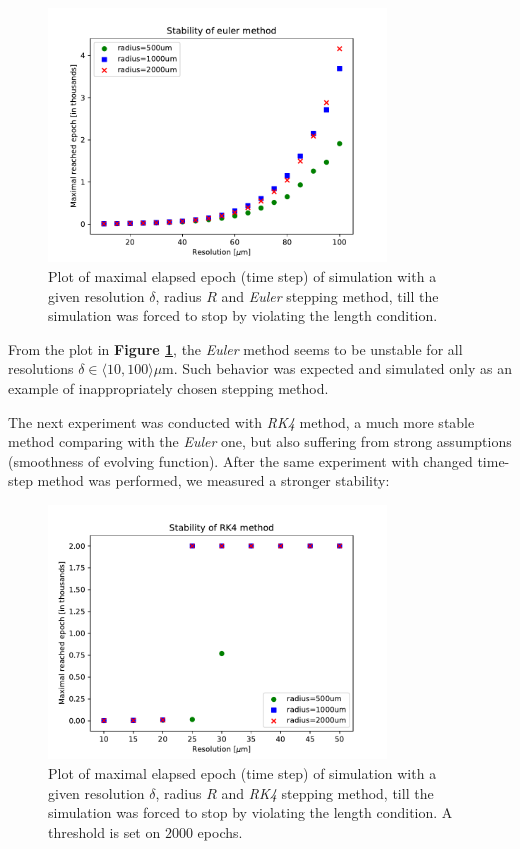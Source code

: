 \begin{figure}[h]
	\centering
	\includegraphics[width=0.8\textwidth]{graphics/results/stability-euler}
	\caption{Plot of maximal elapsed epoch (time step) of simulation with a given resolution $\delta$, radius $R$ and \textit{Euler} stepping method, till the simulation was forced to stop by violating the length condition.}
	\label{stab-euler}
\end{figure}


From the plot in \textbf{Figure \ref{stab-euler}}, the \textit{Euler} method seems to be unstable for all resolutions $\delta \in \langle 10, 100 \rangle \mu\text{m}$. Such behavior was expected and simulated only as an example of inappropriately chosen stepping method.

The next experiment was conducted with \textit{RK4} method, a much more stable method comparing with the \textit{Euler} one, but also suffering from strong assumptions (smoothness of evolving function). After the same experiment with changed time-step method was performed, we measured a stronger stability:

\begin{figure}[h]
	\centering
	\includegraphics[width=0.8\textwidth]{graphics/results/stability-RK4}
	\caption{Plot of maximal elapsed epoch (time step) of simulation with a given resolution $\delta$, radius $R$ and \textit{RK4} stepping method, till the simulation was forced to stop by violating the length condition. A threshold is set on $2000$ epochs.}
	\label{stab-rk4}
\end{figure}

